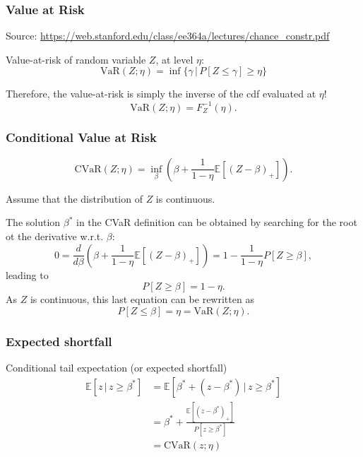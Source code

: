 \documentclass{beamer}
\def\EE{\mathbb{E}}
\begin{document}
\begin{frame}
\frametitle{Value at Risk}

Source: \url{https://web.stanford.edu/class/ee364a/lectures/chance_constr.pdf}

\mbox{}

Value-at-risk of random variable $Z$, at level $\eta$:
$$
\text{VaR}(Z;\eta) = \inf \{ \gamma \,|\, P[Z \leq \gamma] \geq \eta \}
$$

\mbox{}

Therefore, the value-at-risk is simply the inverse of the cdf evaluated at $\eta$!
$$
\text{VaR}(Z;\eta) = F_Z^{-1}(\eta).
$$

\end{frame}

\begin{frame}
\frametitle{Conditional Value at Risk}

$$
\text{CVaR}(Z; \eta) = \inf_{\beta} \left( \beta + \frac{1}{1 - \eta} \EE \left[ (Z - \beta)_+ \right] \right).
$$

\mbox{}

Assume that the distribution of $Z$ is continuous.

\mbox{}

The solution $\beta^*$ in the CVaR definition can be obtained by searching for the root ot the derivative w.r.t. $\beta$:
$$
0 = \frac{d}{d \beta} \left( \beta + \frac{1}{1 - \eta} \EE \left[ (Z - \beta)_+ \right] \right)
= 1 - \frac{1}{1 - \eta} P[ Z \geq \beta ],
$$
leading to
$$
P[ Z \geq \beta ] = 1 - \eta.
$$
As $Z$ is continuous, this last equation can be rewritten as
$$
P[ Z \leq \beta ] = \eta = \text{VaR}(Z; \eta).
$$

\end{frame}

\begin{frame}
\frametitle{Expected shortfall}

Conditional tail expectation (or expected shortfall)
\begin{align*}
\EE[z \,|\, z \geq \beta^* ]
&= \EE[\beta^* + (z - \beta^*) \,|\, z \geq \beta^*] \\
&= \beta^* + \frac{\EE\left[(z - \beta^*)_+\right]}{P[z \geq \beta^*]} \\
&= \text{CVaR}(z; \eta)
\end{align*}

\end{frame}
\end{document}
